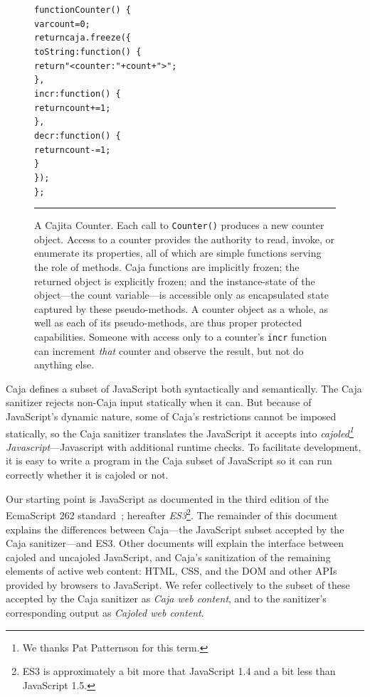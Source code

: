 \documentclass[letterpaper,twocolumn,10pt]{article}
\newcommand{\code}[1]{{\tt {#1}}}              %
\begin{document}
\begin{figure}[t!]
\begin{alltt}
function Counter()\ \{
  var count = 0;
  return caja.freeze(\{
    toString: function()\ \{ 
      return "<counter: " + count + ">"; 
    \},
    incr: function()\ \{ 
      return count += 1; 
    \},
    decr: function()\ \{ 
      return count -= 1; 
    \}
  \});
\};
\end{alltt}

\caption[A Cajita Counter.]{A Cajita Counter. Each call to \code{Counter()} 
produces a new counter object. Access to a counter provides the authority to 
read, invoke, or enumerate its properties, all of which are simple functions 
serving the role of methods. Caja functions are implicitly frozen; the 
returned object is explicitly frozen; and the instance-state of the 
object---the count variable---is accessible only as encapsulated state 
captured by these pseudo-methods. A counter object as a whole, as well as 
each of its pseudo-methods, are thus proper protected capabilities. Someone 
with access only to a counter's \code{incr} function can increment 
\emph{that} counter and observe the result, but not do anything else.
 \\ } \hrule
\label{fig:cajita-counter}
\end{figure}


Caja defines a subset of JavaScript both syntactically and semantically. The 
Caja sanitizer rejects non-Caja input statically when it can. But because of 
JavaScript's dynamic nature, some of Caja's restrictions cannot be imposed 
statically, so the Caja sanitizer translates the JavaScript it accepts into 
\emph{cajoled\footnote{
%
We thanks Pat Patternson for this term.
%
} Javascript}---Javascript with additional runtime checks. To facilitate 
development, it is easy to write a program in the Caja subset of JavaScript 
so it can run correctly whether it is cajoled or not.

Our starting point is JavaScript as documented in the third edition of the 
EcmaScript 262 standard~\cite{ECMA-262}; hereafter \emph{ES3}\footnote{
%
ES3 is approximately a bit more that JavaScript 1.4 and a bit less than 
JavaScript 1.5.
%
}. The remainder of this document explains the differences between Caja---the 
JavaScript subset accepted by the Caja sanitizer---and ES3. Other documents 
will explain the interface between cajoled and uncajoled JavaScript, and 
Caja's sanitization of the remaining elements of active web content: HTML, 
CSS, and the DOM and other APIs provided by browsers to JavaScript. We refer 
collectively to the subset of these accepted by the Caja sanitizer as 
\emph{Caja web content}, and to the sanitizer's corresponding output as 
\emph{Cajoled web content}.
\end{document}
